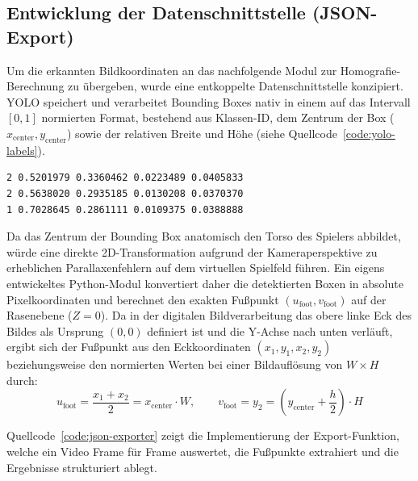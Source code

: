 \subsection{Entwicklung der Datenschnittstelle (JSON-Export)}

Um die erkannten Bildkoordinaten an das nachfolgende Modul zur Homografie-Berechnung zu übergeben, wurde 
eine entkoppelte Datenschnittstelle konzipiert. \ac{YOLO} speichert und verarbeitet Bounding Boxes nativ 
in einem auf das Intervall $[0, 1]$ normierten Format, bestehend aus Klassen-ID, dem Zentrum der 
Box ($x_{\text{center}}, y_{\text{center}}$) sowie der relativen Breite und Höhe 
(siehe Quellcode~\ref{code:yolo-labels}).

\begin{lstlisting}[caption={Auszug aus den nativen YOLO-Label-Daten (Klassen-ID, x\_center, y\_center, width, height)}, label=code:yolo-labels]
2 0.5201979 0.3360462 0.0223489 0.0405833
2 0.5638020 0.2935185 0.0130208 0.0370370
1 0.7028645 0.2861111 0.0109375 0.0388888
\end{lstlisting}

Da das Zentrum der Bounding Box anatomisch den Torso des Spielers abbildet, würde eine direkte 
2D-Transformation aufgrund der Kameraperspektive zu erheblichen Parallaxenfehlern auf dem 
virtuellen Spielfeld führen. Ein eigens entwickeltes Python-Modul konvertiert daher die 
detektierten Boxen in absolute Pixelkoordinaten und berechnet den exakten Fußpunkt 
$(u_{\text{foot}}, v_{\text{foot}})$ auf der Rasenebene ($Z=0$). Da in der digitalen 
Bildverarbeitung das obere linke Eck des Bildes als Ursprung $(0,0)$ definiert ist und 
die Y-Achse nach unten verläuft, ergibt sich der Fußpunkt aus den Eckkoordinaten 
$(x_1, y_1, x_2, y_2)$ beziehungsweise den normierten Werten bei einer Bildauflösung von 
$W \times H$ durch:
\begin{equation}
    u_{\text{foot}} = \frac{x_1 + x_2}{2} = x_{\text{center}} \cdot W, \qquad v_{\text{foot}} = y_2 = \left(y_{\text{center}} + \frac{h}{2}\right) \cdot H
\end{equation}

Quellcode~\ref{code:json-exporter} zeigt die Implementierung der Export-Funktion, welche 
ein Video Frame für Frame auswertet, die Fußpunkte extrahiert und die Ergebnisse strukturiert 
ablegt.

